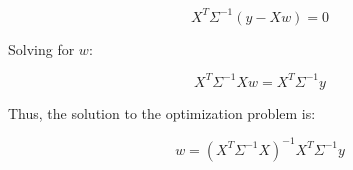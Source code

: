 \documentclass[oneside,solution]{seu-ml-assign}
\begin{document}
\begin{equation}
  X^T \Sigma^{-1} (y - Xw) = 0
\end{equation}

Solving for \( w \):

\begin{equation}
  X^T \Sigma^{-1} X w = X^T \Sigma^{-1} y
\end{equation}

Thus, the solution to the optimization problem is:

\begin{equation}
  w = (X^T \Sigma^{-1} X)^{-1} X^T \Sigma^{-1} y
\end{equation}


\vspace{2mm}
\end{document}
